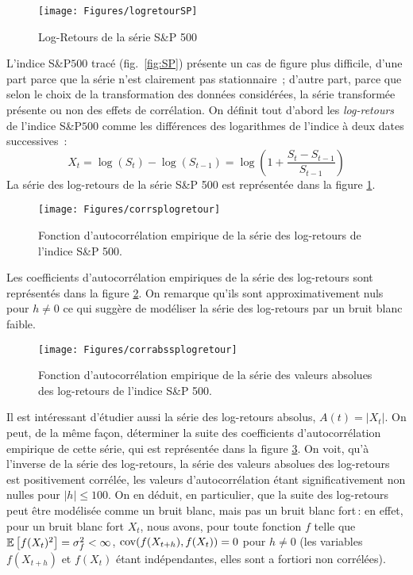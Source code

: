 \begin{figure}
  \centering
  \texttt{[image: Figures/logretourSP]}\\
  \caption{Log-Retours de la s\'erie S\&P 500}\label{fig:sp-logretour}
\end{figure}
 L'indice S\&P$500$ trac\'e (fig.~\ref{fig:SP}) pr\'esente un cas de figure plus
 difficile, d'une part parce que la s\'erie n'est clairement pas
 stationnaire~; d'autre part, parce que selon le choix de la transformation des
 donn\'ees consid\'er\'ees, la s\'erie transform\'ee pr\'esente ou non des effets de
 corr\'elation. On d\'efinit tout d'abord les \emph{log-retours} de l'indice
 S\&P$500$ comme les diff\'erences des logarithmes de l'indice \`a deux dates
 successives~:
\[
 X_{t} = \log( S_{t}) - \log(S_{t-1})
      = \log \left( 1 + \frac{S_{t}-S_{t-1}}{S_{t-1}} \right)
\]
La s\'erie des log-retours de la s\'erie S\&P 500 est repr\'esent\'ee dans la
figure \ref{fig:sp-logretour}.

\begin{figure}
  \centering
  \texttt{[image: Figures/corrsplogretour]}\\
  \caption{Fonction d'autocorr\'elation empirique de la s\'erie des log-retours
 de l'indice S\&P 500.}\label{fig:sp-xcorr}
\end{figure}
  Les coefficients d'autocorr\'elation
empiriques de la s\'erie des log-retours sont repr\'esent\'es dans la figure
\ref{fig:sp-xcorr}. On remarque qu'ils sont approximativement nuls
pour $h \ne 0$ ce qui sugg\`ere de mod\'eliser la s\'erie des
log-retours par un bruit blanc faible.
\begin{figure}
  \centering
  \texttt{[image: Figures/corrabssplogretour]}\\
  \caption{Fonction d'autocorr\'elation empirique de la s\'erie des valeurs absolues des
 log-retours de l'indice S\&P 500.}\label{fig:sp-abs-xcorr}
\end{figure}
Il est int\'eressant d'\'etudier aussi la s\'erie des log-retours
absolus, $A(t) = |X_{t}|$. On peut, de la m\^{e}me fa\c{c}on,
d\'eterminer la suite des coefficients d'autocorr\'elation empirique
de cette s\'erie, qui est repr\'esent\'ee dans la figure
\ref{fig:sp-abs-xcorr}. On voit, qu'\`a l'inverse de la s\'erie des
log-retours, la s\'erie des valeurs absolues des log-retours est
positivement corr\'el\'ee, les valeurs d'autocorr\'elation \'etant
significativement non nulles pour $|h| \leq 100$. On en d\'eduit, en
particulier, que la suite des log-retours peut \^{e}tre mod\'elis\'ee
comme un bruit blanc, mais pas un bruit blanc fort\,: en effet,
pour un bruit blanc fort $X_{t}$, nous avons, pour toute fonction
$f$ telle que ${\mathbb E}\left[ f(X_{t})^2 \right] = \sigma_f^2 < \infty$,
$\mathrm{cov}(f(X_{t+h}),f(X_{t}))= 0$ pour $h\neq 0$ (les variables
$f(X_{t+h})$ et $f(X_{t})$ \'etant ind\'ependantes, elles sont a
fortiori non corr\'el\'ees).

